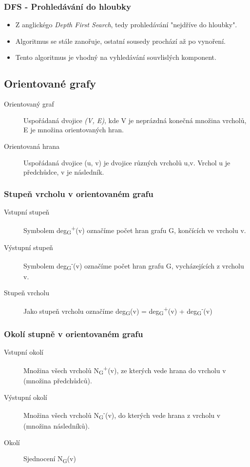     \subsubsection{DFS - Prohledávání do hloubky}
      \begin{itemize}
        \item Z anglickégo \emph{Depth First Search}, tedy prohledávání "nejdříve do hloubky".
        \item Algoritmus se stále zanořuje, ostatní sousedy prochází až po vynoření.
        \item Tento algoritmus je vhodný na vyhledávání souvlislých komponent.
      \end{itemize}

  \subsection{Orientované grafy}

    \begin{description}
      \item[Orientovaný graf] Uspořádaná dvojice \emph{(V, E)}, kde V je neprázdná konečná množina vrcholů, E je množina orientovaných hran.
      \item[Orientovaná hrana] Uspořádaná dvojice (u, v) je dvojice různých vrcholů u,v. Vrchol u je předchůdce, v je následník.
    \end{description}

    \subsubsection{Stupeň vrcholu v orientovaném grafu}
      \begin{description}
        \item[Vstupní stupeň] Symbolem deg\textsubscript{G}\textsuperscript{+}(v) označíme počet hran grafu G, končících ve vrcholu v.
        \item[Výstupní stupeň] Symbolem deg\textsubscript{G}\textsuperscript{-}(v) označíme počet hran grafu G, vycházejících z vrcholu v.
        \item[Stupeň vrcholu] Jako stupeň vrcholu označíme deg\textsubscript{G}(v) = deg\textsubscript{G}\textsuperscript{+}(v) + deg\textsubscript{G}\textsuperscript{-}(v)
      \end{description}

    \subsubsection{Okolí stupně v orientovaném grafu}
      \begin{description}
        \item[Vstupní okolí] Množina všech vrcholů N\textsubscript{G}\textsuperscript{+}(v), ze kterých vede hrana do vrcholu v (množina předchůdců).
        \item[Výstupní okolí] Množina všech vrcholů N\textsubscript{G}\textsuperscript{-}(v), do kterých vede hrana z vrcholu v (množina následníků).
        \item[Okolí] Sjednocení N\textsubscript{G}(v)
      \end{description}

